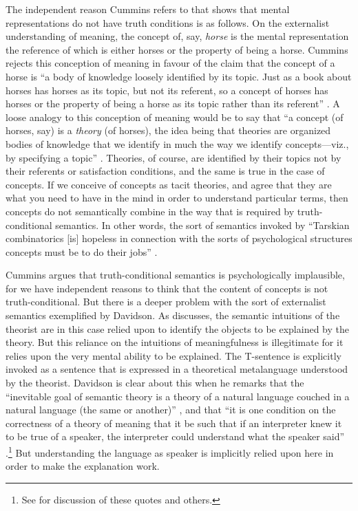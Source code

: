 The independent reason Cummins refers to that shows that mental representations do not have truth conditions is as follows. On the externalist understanding of meaning, the concept of, say, \textit{horse} is the mental representation the reference of which is either horses or the property of being a horse. Cummins rejects this conception of meaning in favour of the claim that the concept of a horse is “a body of knowledge loosely identified by its topic. Just as a book about horses has horses as its topic, but not its referent, so a concept of horses has horses or the property of being a horse as its topic rather than its referent” \citep[158]{Cummins2002}. A loose analogy to this conception of meaning would be to say that “a concept (of horses, say) is a \textit{theory} (of horses), the idea being that theories are organized bodies of knowledge that we identify in much the way we identify concepts—viz., by specifying a topic” \citep[158, emphasis in original]{Cummins2002}. Theories, of course, are identified by their topics not by their referents or satisfaction conditions, and the same is true in the case of concepts. If we conceive of concepts as tacit theories, and agree that they are what you need to have in the mind in order to understand particular terms, then concepts do not semantically combine in the way that is required by truth-conditional semantics. In other words, the sort of semantics invoked by “Tarskian combinatorics [is] hopeless in connection with the sorts of psychological structures concepts must be to do their jobs” \citep[159]{Cummins2002}.

Cummins argues that truth-conditional semantics is psychologically implausible, for we have independent reasons to think that the content of concepts is not truth-conditional. But there is a deeper problem with the sort of externalist semantics exemplified by Davidson. As \citet{Slezak2014,Slezak2018} discusses, the semantic intuitions of the theorist are in this case relied upon to identify the objects to be explained by the theory. But this reliance on the intuitions of meaningfulness is illegitimate for it relies upon the very mental ability to be explained. The T-sentence is explicitly invoked as a sentence that is expressed in a theoretical metalanguage understood by the theorist. Davidson is clear about this when he  remarks that the “inevitable goal of semantic theory is a theory of a natural language couched in a natural language (the same or another)” \citep[71]{Davidson1973a}, and that “it is one condition on the correctness of a theory of meaning that it be such that if an interpreter knew it to be true of a speaker, the interpreter could understand what the speaker said” \citep[131]{Davidson1995}.\footnote{See \citet{Slezak2018} for discussion of these quotes and others.} But understanding the language as speaker is implicitly relied upon here in order to make the explanation work.


